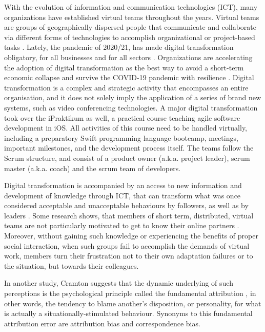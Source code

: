 \documentclass[a4paper]{article}
\begin{document}
With the evolution of information and communication technologies (ICT), many organizations have established virtual teams throughout the years. Virtual teams are groups of geographically dispersed people that communicate and collaborate via different forms of technologies to accomplish organizational or project-based tasks \cite{Townsed1998}. Lately, the pandemic of 2020/21, has made digital transformation obligatory, for all businesses and for all sectors \cite{Fletcher2020}. Organizations are accelerating the adoption of digital transformation as the best way to avoid a short-term economic collapse and survive the COVID-19 pandemic with resilience \cite{Pedro2020}. Digital transformation is a complex and strategic activity that encompasses an entire organisation, and it does not solely imply the application of a series of brand new systems, such as video conferencing technologies. A major digital transformation took over the iPraktikum as well, a practical course teaching agile software development in iOS. All activities of this course need to be handled virtually, including a preparatory Swift programming language bootcamp, meetings, important milestones, and the development process itself. The teams follow the Scrum structure, and consist of a product owner (a.k.a. project leader), scrum master (a.k.a. coach) and the scrum team of developers.

Digital transformation is accompanied by an access to new information and development of knowledge through ICT, that can transform what was once considered acceptable and unacceptable behaviours by followers, as well as by leaders \cite{Avolio2000}. Some research shows, that members of short term, distributed, virtual teams are not particularly motivated to get to know their online partners \cite{Walther2002}. Moreover, without gaining such knowledge or experiencing the benefits of proper social interaction, when such groups fail to accomplish the demands of virtual work, members turn their frustration not to their own adaptation failures or to the situation, but towards their colleagues.  

In another study, Cramton \cite{Cramton2001} suggests that the dynamic underlying of such perceptions is the psychological principle called the fundamental attribution \cite{Tidwell2002}, in other words, the tendency to blame another's disposition, or personality, for what is actually a situationally-stimulated behaviour. Synonyms to this fundamental attribution error are attribution bias and correspondence bias.
\end{document}
